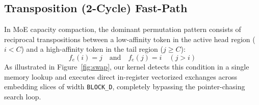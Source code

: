 \documentclass[10pt,twocolumn]{article}
\begin{document}
\subsection{Transposition (2-Cycle) Fast-Path}
In MoE capacity compaction, the dominant permutation pattern consists of reciprocal transpositions between a low-affinity token in the active head region ($i < C$) and a high-affinity token in the tail region ($j \ge C$):
\begin{equation}
    f_e(i) = j \quad \text{and} \quad f_e(j) = i \quad (j > i)
\end{equation}
As illustrated in Figure~\ref{fig:swap}, our kernel detects this condition in a single memory lookup and executes direct in-register vectorized exchanges across embedding slices of width \texttt{BLOCK\_D}, completely bypassing the pointer-chasing search loop.
\end{document}
